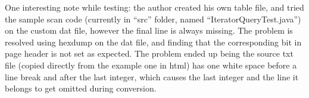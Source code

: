 \documentclass[11pt]{article}
\begin{document}
One interesting note while testing: the author created his own table file, and tried the sample scan code (currently in ``src'' folder, named ``IteratorQueryTest.java'') on the custom dat file, however the final line is always missing. The problem is resolved using hexdump on the dat file, and finding that the corresponding bit in page header is not set as expected. The problem ended up being the source txt file (copied directly from the example one in html) has one white space before a line break and after the last integer, which causes the last integer and the line it belongs to get omitted during conversion.
\end{document}

